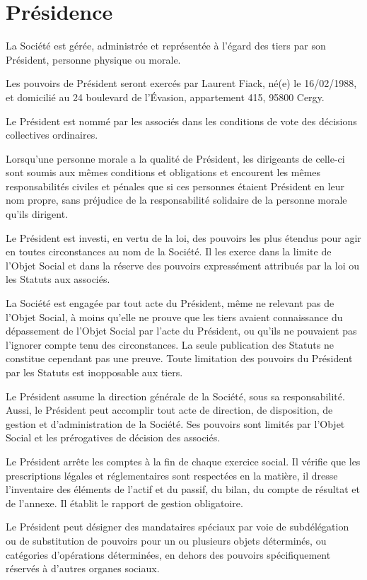 \documentclass[a4paper,12pt]{report}
\newcommand{\lfAddress}{24 boulevard de l'Évasion, appartement 415, 95800 Cergy}
\begin{document}
\section{Présidence}
La Société est gérée, administrée et représentée à l'égard des tiers par son Président, personne physique ou morale.

Les pouvoirs de Président seront exercés par Laurent Fiack, né(e) le 16/02/1988, et domicilié au \lfAddress.

Le Président est nommé par les associés dans les conditions de vote des décisions collectives ordinaires.

Lorsqu'une personne morale a la qualité de Président, les dirigeants de celle-ci sont soumis aux mêmes conditions et obligations 
et encourent les mêmes responsabilités civiles et pénales que si ces personnes étaient Président en leur nom propre, 
sans préjudice de la responsabilité solidaire de la personne morale qu'ils dirigent.

Le Président est investi, en vertu de la loi, des pouvoirs les plus étendus pour agir en toutes circonstances au nom de la Société. 
Il les exerce dans la limite de l'Objet Social et dans la réserve des pouvoirs expressément attribués par la loi ou les Statuts aux associés.

La Société est engagée par tout acte du Président, même ne relevant pas de l'Objet Social, 
à moins qu'elle ne prouve que les tiers avaient connaissance du dépassement de l'Objet Social par l'acte du Président, 
ou qu'ils ne pouvaient pas l'ignorer compte tenu des circonstances. 
La seule publication des Statuts ne constitue cependant pas une preuve. 
Toute limitation des pouvoirs du Président par les Statuts est inopposable aux tiers.

Le Président assume la direction générale de la Société, sous sa responsabilité. 
Aussi, le Président peut accomplir tout acte de direction, de disposition, de gestion et d'administration de la Société. 
Ses pouvoirs sont limités par l'Objet Social et les prérogatives de décision des associés.

Le Président arrête les comptes à la fin de chaque exercice social. 
Il vérifie que les prescriptions légales et réglementaires sont respectées en la matière, 
il dresse l'inventaire des éléments de l'actif et du passif, du bilan, du compte de résultat et de l'annexe. 
Il établit le rapport de gestion obligatoire.

Le Président peut désigner des mandataires spéciaux par voie de subdélégation ou de substitution de pouvoirs pour un ou plusieurs objets déterminés, 
ou catégories d'opérations déterminées, en dehors des pouvoirs spécifiquement réservés à d'autres organes sociaux.
\end{document}
